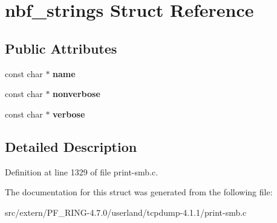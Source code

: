\hypertarget{structnbf__strings}{
\section{nbf\_\-strings Struct Reference}
\label{structnbf__strings}
}
\subsection*{Public Attributes}
\begin{DoxyCompactItemize}
\item 
\hypertarget{structnbf__strings_a56a40ecb914cda58377f128fbd25278c}{
const char $\ast$ {\bfseries name}}
\label{structnbf__strings_a56a40ecb914cda58377f128fbd25278c}

\item 
\hypertarget{structnbf__strings_a27be19dee8d22dd77c6b08fdc618a117}{
const char $\ast$ {\bfseries nonverbose}}
\label{structnbf__strings_a27be19dee8d22dd77c6b08fdc618a117}

\item 
\hypertarget{structnbf__strings_a6ae80661d4c3621baa1cfcaec6705c4f}{
const char $\ast$ {\bfseries verbose}}
\label{structnbf__strings_a6ae80661d4c3621baa1cfcaec6705c4f}

\end{DoxyCompactItemize}


\subsection{Detailed Description}


Definition at line 1329 of file print-\/smb.c.



The documentation for this struct was generated from the following file:\begin{DoxyCompactItemize}
\item 
src/extern/PF\_\-RING-\/4.7.0/userland/tcpdump-\/4.1.1/print-\/smb.c\end{DoxyCompactItemize}
